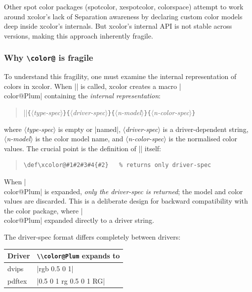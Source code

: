 \documentclass[luatex]{article}
\newcommand\pkg[1]{\textsf{#1}}
\newcommand\cs[1]{\texttt{\textbackslash #1}}
\providecommand\meta[1]{\ensuremath{\langle}\textit{#1}\ensuremath{\rangle}}
\providecommand\marg[1]{\texttt{\{}\meta{#1}\texttt{\}}}
\begin{document}
Other spot color packages (\pkg{spotcolor}, \pkg{xespotcolor}, \pkg{colorspace})
attempt to work around \pkg{xcolor}'s lack of Separation awareness
by declaring custom color models deep inside \pkg{xcolor}'s internals.
But \pkg{xcolor}'s internal API is not stable across versions,
making this approach inherently fragile.

\subsubsection{Why \cs{color@} is fragile}

To understand this fragility, one must examine the internal representation of colors in \pkg{xcolor}.
When || is called, \pkg{xcolor} creates a macro |\\color@Plum| containing the \emph{internal representation}:
\begin{quote}
|\xcolor@|\marg{type-spec}\marg{driver-spec}\marg{n-model}\marg{n-color-spec}
\end{quote}
where \meta{type-spec} is empty or |named|, \meta{driver-spec} is a driver-dependent string, \meta{n-model} is the color model name, and \meta{n-color-spec} is the normalised color values.
The crucial point is the definition of |\xcolor@| itself:
\begin{quote}
\begin{verbatim}
\def\xcolor@#1#2#3#4{#2}   % returns only driver-spec
\end{verbatim}
\end{quote}
When |\\color@Plum| is expanded, \emph{only the driver-spec is returned}; the model and color values are discarded.
This is a deliberate design for backward compatibility with the \pkg{color} package, where |\\color@Plum| expanded directly to a driver string.

The driver-spec format differs completely between drivers:
\begin{center}
\small
\renewcommand{\arraystretch}{1.3}
\begin{tabular}{ll}
\hline
Driver & \texttt{\textbackslash\textbackslash color@Plum} expands to \\
\hline
dvips   & |rgb 0.5 0 1| \\
pdftex  & |0.5 0 1 rg 0.5 0 1 RG| \\
\hline
\end{tabular}
\end{center}
\end{document}
